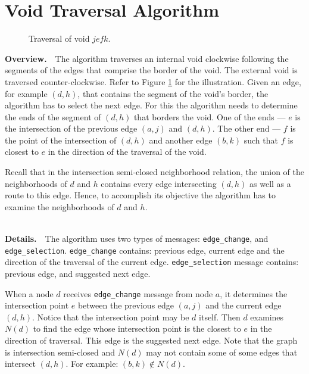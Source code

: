 \documentclass[conference]{IEEEtran}
\def\TT#1{\texttt{#1}}
\begin{document}
\section{Void Traversal Algorithm}
\label{SecTraversal}

\begin{figure} 
\center {}
\caption{Traversal of void $jefk$.}
\label{FigTraversal} 
\end{figure}

\noindent
\textbf{Overview.}\ \ The algorithm traverses an internal void
clockwise following the segments of the edges that comprise the border
of the void. The external void is traversed counter-clockwise.  Refer
to Figure \ref{FigTraversal} for the illustration. Given an edge, for
example $(d,h)$, that contains the segment of the void's border, the
algorithm has to select the next edge. For this the algorithm needs to
determine the ends of the segment of $(d,h)$ that borders the
void. One of the ends --- $e$ is the intersection of the previous edge
$(a,j)$ and $(d,h)$. The other end --- $f$ is the point of the
intersection of $(d,h)$ and another edge $(b,k)$ such that $f$ is
closest to $e$ in the direction of the traversal of the void.

Recall that in the intersection semi-closed neighborhood relation, the
union of the neighborhoods of $d$ and $h$ contains every edge
intersecting $(d,h)$ as well as a route to this edge. Hence, to
accomplish its objective the algorithm has to examine the
neighborhoods of $d$ and $h$.

\ \\ \noindent
\textbf{Details.}\ \
The algorithm uses two types of messages: \TT{edge\_change}, and
\TT{edge\_selection}.  \TT{edge\_change} contains: previous edge,
current edge and the direction of the traversal of the current
edge. \TT{edge\_selection} message contains: previous edge, and
suggested next edge.

When a node $d$ receives \TT{edge\_change} message from node $a$, it
determines the intersection point $e$ between the previous edge
$(a,j)$ and the current edge $(d,h)$. Notice that the intersection
point may be $d$ itself.  Then $d$ examines $N(d)$ to find the edge
whose intersection point is the closest to $e$ in the direction of
traversal. This edge is the suggested next edge.  Note that the graph
is intersection semi-closed and $N(d)$ may not contain some of some
edges that intersect $(d,h)$. For example: $(b,k) \not \in N(d)$.
\end{document}
